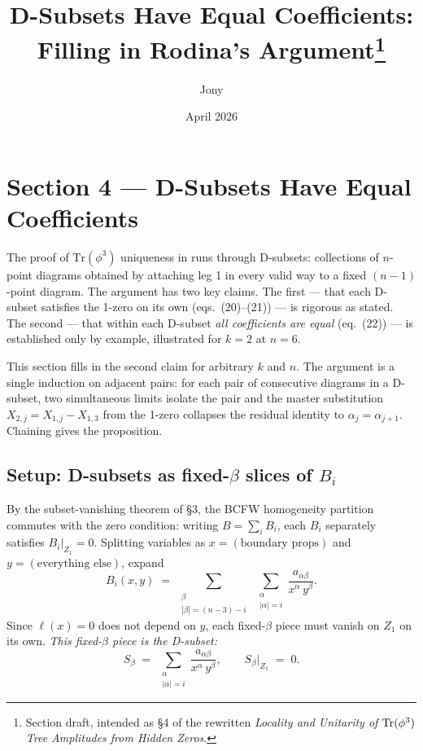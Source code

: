 \documentclass[11pt]{article}
\title{D-Subsets Have Equal Coefficients: Filling in Rodina's Argument\thanks{Section draft, intended as \S4 of the rewritten \emph{Locality and Unitarity of $\Tr(\phi^3)$ Tree Amplitudes from Hidden Zeros}.}}
\author{Jony}
\date{April 2026}
\theoremstyle{definition}
\newcommand{\Tr}{\mathrm{Tr}}
\begin{document}
\maketitle

\setcounter{section}{4}
\renewcommand{\thesection}{\arabic{section}}
\renewcommand{\thesubsection}{\thesection.\arabic{subsection}}

\section*{Section 4 --- D-Subsets Have Equal Coefficients}

\noindent
The proof of $\Tr(\phi^3)$ uniqueness in \cite[``Tr$(\phi^3)$ subset zeros and uniqueness'']{Rodina} runs through D-subsets: collections of $n$-point diagrams obtained by attaching leg 1 in every valid way to a fixed $(n-1)$-point diagram. The argument has two key claims. The first --- that each D-subset satisfies the 1-zero on its own (eqs.~(20)--(21)) --- is rigorous as stated. The second --- that within each D-subset \emph{all coefficients are equal} (eq.~(22)) --- is established only by example, illustrated for $k=2$ at $n=6$.

This section fills in the second claim for arbitrary $k$ and $n$. The argument is a single induction on adjacent pairs: for each pair of consecutive diagrams in a D-subset, two simultaneous limits isolate the pair and the master substitution $X_{2,j} = X_{1,j} - X_{1,3}$ from the 1-zero collapses the residual identity to $\alpha_j = \alpha_{j+1}$. Chaining gives the proposition.

\subsection{Setup: D-subsets as fixed-$\beta$ slices of $B_i$}

By the subset-vanishing theorem of \S3, the BCFW homogeneity partition commutes with the zero condition: writing $B = \sum_i B_i$, each $B_i$ separately satisfies $B_i|_{Z_1} = 0$. Splitting variables as $x = (\text{boundary props})$ and $y = (\text{everything else})$, expand
\[
B_i(x,y) \;=\; \sum_{\substack{\beta\\|\beta|=(n-3)-i}}\;\sum_{\substack{\alpha\\|\alpha|=i}} \frac{a_{\alpha\beta}}{x^\alpha\,y^\beta}.
\]
Since $\ell(x) = 0$ does not depend on $y$, each fixed-$\beta$ piece must vanish on $Z_1$ on its own. \emph{This fixed-$\beta$ piece is the D-subset:}
\[
S_\beta \;=\; \sum_{\substack{\alpha\\|\alpha|=i}} \frac{a_{\alpha\beta}}{x^\alpha\,y^\beta}, \qquad S_\beta\big|_{Z_1} \;=\; 0.
\]
\end{document}
